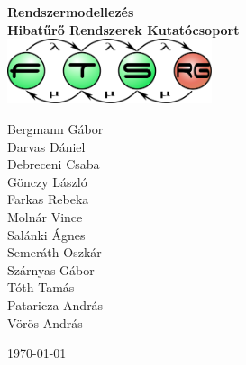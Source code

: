 \begin{titlepage}
\begin{center}
\vspace*{5cm}

{\huge \bfseries Rendszermodellezés}\\[0.8cm]

{\Large \bfseries Hibatűrő Rendszerek Kutatócsoport}\\[0.8cm]

\includegraphics[width=60mm,keepaspectratio]{figures/ftsrg-logo}\\

\vfill

Bergmann Gábor \\
Darvas Dániel \\
Debreceni Csaba \\
Gönczy László \\
Farkas Rebeka \\
Molnár Vince \\
Salánki Ágnes \\
Semeráth Oszkár \\
Szárnyas Gábor \\
Tóth Tamás \\
Pataricza András \\
Vörös András

\vfill

{\large \today}

\vspace{3cm}
\end{center}
\end{titlepage}
